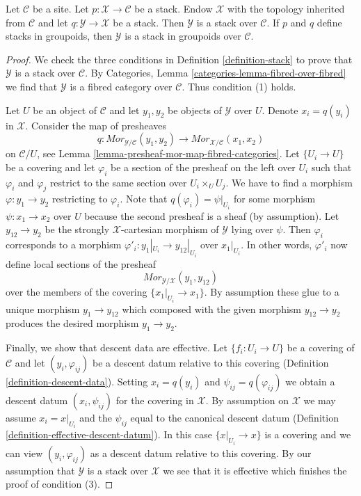 \begin{lemma}
\label{lemma-stack-over-stack}
Let $\mathcal{C}$ be a site. Let $p : \mathcal{X} \to \mathcal{C}$
be a stack. Endow $\mathcal{X}$ with the topology inherited from
$\mathcal{C}$ and let $q : \mathcal{Y} \to \mathcal{X}$ be a stack.
Then $\mathcal{Y}$ is a stack over $\mathcal{C}$.
If $p$ and $q$ define stacks in groupoids, then
$\mathcal{Y}$ is a stack in groupoids over $\mathcal{C}$.
\end{lemma}

\begin{proof}
We check the three conditions in Definition \ref{definition-stack}
to prove that $\mathcal{Y}$ is a stack over $\mathcal{C}$.
By Categories, Lemma \ref{categories-lemma-fibred-over-fibred}
we find that $\mathcal{Y}$ is a fibred category over $\mathcal{C}$.
Thus condition (1) holds.

\medskip\noindent
Let $U$ be an object of $\mathcal{C}$ and let $y_1, y_2$ be objects
of $\mathcal{Y}$ over $U$. Denote $x_i = q(y_i)$ in $\mathcal{X}$.
Consider the map of presheaves
$$
q : \mathit{Mor}_{\mathcal{Y}/\mathcal{C}}(y_1, y_2)
\longrightarrow
\mathit{Mor}_{\mathcal{X}/\mathcal{C}}(x_1, x_2)
$$
on $\mathcal{C}/U$, see Lemma \ref{lemma-presheaf-mor-map-fibred-categories}.
Let $\{U_i \to U\}$ be a covering and let $\varphi_i$ be a section
of the presheaf on the left over $U_i$ such that $\varphi_i$ and
$\varphi_j$ restrict to the same section over $U_i \times_U U_j$.
We have to find a morphism $\varphi : y_1 \to y_2$ restricting to $\varphi_i$.
Note that $q(\varphi_i) = \psi|_{U_i}$ for some morphism
$\psi : x_1 \to x_2$ over $U$ because the second presheaf is a sheaf
(by assumption). Let $y_{12} \to y_2$ be the strongly $\mathcal{X}$-cartesian
morphism of $\mathcal{Y}$ lying over $\psi$. Then $\varphi_i$ corresponds
to a morphism $\varphi'_i : y_1|_{U_i} \to y_{12}|_{U_i}$ over $x_1|_{U_i}$.
In other words, $\varphi'_i$ now define local sections of the presheaf
$$
\mathit{Mor}_{\mathcal{Y}/\mathcal{X}}(y_1, y_{12})
$$
over the members of the covering $\{x_1|_{U_i} \to x_1\}$. By assumption these
glue to a unique morphism $y_1 \to y_{12}$ which composed with the given
morphism $y_{12} \to y_2$ produces the desired morphism $y_1 \to y_2$.

\medskip\noindent
Finally, we show that descent data are effective. Let $\{f_i : U_i \to U\}$
be a covering of $\mathcal{C}$ and let $(y_i, \varphi_{ij})$ be a descent
datum relative to this covering (Definition \ref{definition-descent-data}).
Setting $x_i = q(y_i)$ and $\psi_{ij} = q(\varphi_{ij})$
we obtain a descent datum $(x_i, \psi_{ij})$ for the covering in $\mathcal{X}$.
By assumption on $\mathcal{X}$ we may assume $x_i = x|_{U_i}$
and the $\psi_{ij}$ equal to the canonical descent datum
(Definition \ref{definition-effective-descent-datum}).
In this case $\{x|_{U_i} \to x\}$ is a covering and we can view
$(y_i, \varphi_{ij})$ as a descent datum relative to this covering.
By our assumption that $\mathcal{Y}$ is a stack over $\mathcal{X}$
we see that it is effective which finishes the proof of condition (3).


\end{proof}
